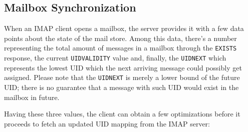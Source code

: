 \documentclass[trojita]{subfiles}
\begin{document}
\subsection{Mailbox Synchronization}

When an IMAP client opens a mailbox, the server provides it with a few data points about the state of the mail store.
Among this data, there's a number representing the total amount of messages in a mailbox through the {\tt EXISTS}
response, the current {\tt UIDVALIDITY} value and, finally, the {\tt UIDNEXT} which represents the lowest UID which the
next arriving message could possibly get assigned.  Please note that the {\tt UIDNEXT} is merely a lower bound of the
future UID; there is no guarantee that a message with such UID would exist in the mailbox in future.

Having these three values, the client can obtain a few optimizations before it proceeds to fetch an updated UID mapping
from the IMAP server:
\end{document}
